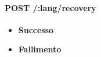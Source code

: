 \paragraph{POST /:lang/recovery}
\begin{itemize}
\item \textbf{Successo}
\item \textbf{Fallimento}
\end{itemize}